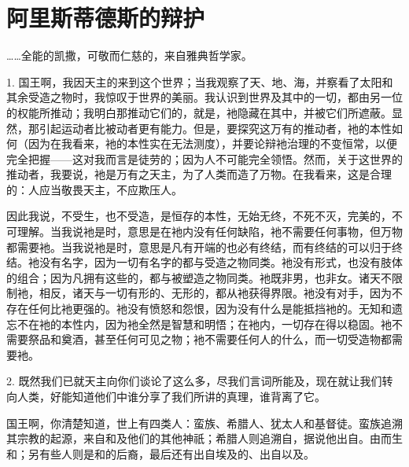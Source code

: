 
\chapter{阿里斯蒂德斯的辩护}


\par

……全能的凯撒，可敬而仁慈的，来自雅典哲学家。\par

1. 国王啊，我因天主的来到这个世界；当我观察了天、地、海，并察看了太阳和其余受造之物时，我惊叹于世界的美丽。我认识到世界及其中的一切，都由另一位的权能所推动；我明白那推动它们的，就是，衪隐藏在其中，并被它们所遮蔽。显然，那引起运动者比被动者更有能力。但是，要探究这万有的推动者，衪的本性如何（因为在我看来，衪的本性实在无法测度），并要论辩衪治理的不变恒常，以便完全把握——这对我而言是徒劳的；因为人不可能完全领悟。然而，关于这世界的推动者，我要说，衪是万有之天主，为了人类而造了万物。在我看来，这是合理的：人应当敬畏天主，不应欺压人。\par

因此我说，不受生，也不受造，是恒存的本性，无始无终，不死不灭，完美的，不可理解。当我说衪是时，意思是在衪内没有任何缺陷，衪不需要任何事物，但万物都需要衪。当我说衪是时，意思是凡有开端的也必有终结，而有终结的可以归于终结。衪没有名字，因为一切有名字的都与受造之物同类。衪没有形式，也没有肢体的组合；因为凡拥有这些的，都与被塑造之物同类。衪既非男，也非女。诸天不限制衪，相反，诸天与一切有形的、无形的，都从衪获得界限。衪没有对手，因为不存在任何比衪更强的。衪没有愤怒和怨恨，因为没有什么是能抵挡衪的。无知和遗忘不在衪的本性内，因为衪全然是智慧和明悟；在衪内，一切存在得以稳固。衪不需要祭品和奠酒，甚至任何可见之物；衪不需要任何人的什么，而一切受造物都需要衪。\par

2. 既然我们已就天主向你们谈论了这么多，尽我们言词所能及，现在就让我们转向人类，好能知道他们中谁分享了我们所讲的真理，谁背离了它。\par

国王啊，你清楚知道，世上有四类人：蛮族、希腊人、犹太人和基督徒。蛮族追溯其宗教的起源，来自和及他们的其他神祇；希腊人则追溯自，据说他出自。由而生和；另有些人则是和的后裔，最后还有出自埃及的、出自以及。\par

